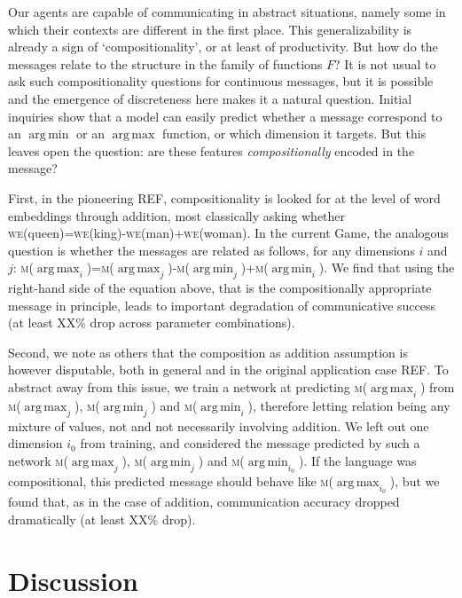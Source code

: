 \documentclass[11pt,a4paper]{article}
\DeclareMathOperator*{\argmax}{arg\,max}
\DeclareMathOperator*{\argmin}{arg\,min}
\newcommand{\nbEC}[1]{{\leavevmode\color{blue}{\scriptsize#1}}}
\newcommand{\addEC}[1]{{\leavevmode\color{blue}#1}}
\begin{document}
Our agents are capable of communicating in abstract situations, namely some in which their contexts are different in the first place. This generalizability is already a sign of `compositionality', or at least of productivity. But how do the messages relate to the structure in the family of functions $F$? It is not usual to ask such compositionality questions for continuous messages, but it is possible and the emergence of discreteness here makes it a natural question. Initial inquiries show that a model can easily predict whether a message correspond to an $\argmin$ or an $\argmax$ function, or which dimension it targets. But this leaves open the question: are these features \emph{compositionally} encoded in the message?

\newcommand{\WE}[1]{\textsc{we}(#1)}
\newcommand{\MESS}[1]{\textsc{m}(#1)}

First, in the pioneering \addEC{REF}, compositionality is looked for at the level of word embeddings through addition, most classically asking whether  
\WE{queen}=\WE{king}-\WE{man}+\WE{woman}. In the current Game, the analogous question is whether the messages are related as follows, for any dimensions $i$ and $j$:
\MESS{$\argmax_i$}=\MESS{$\argmax_j$}-\MESS{$\argmin_j$}+\MESS{$\argmin_i$}. We find that using the right-hand side of the equation above, that is the compositionally appropriate message in principle, leads to important degradation of communicative success \addEC{(at least XX\% drop across parameter combinations).}
\nbEC{Can describe results that efficiently?}

Second, we note as others that the composition as addition assumption is however disputable, both in general and in the original application case \addEC{REF}. To abstract away from this issue, we train a network at predicting 
\MESS{$\argmax_i$} from \MESS{$\argmax_j$}, \MESS{$\argmin_j$} and \MESS{$\argmin_i$}, therefore letting relation being any mixture of values, not and not necessarily involving addition. We left out one dimension $i_0$ from training, and considered the message predicted by such a network \MESS{$\argmax_j$}, \MESS{$\argmin_j$} and \MESS{$\argmin_{i_0}$}. If the language was compositional, this predicted message should behave like \MESS{$\argmax_{i_0}$}, but we found that, as in the case of addition, communication accuracy dropped dramatically \addEC{(at least XX\% drop).}
\nbEC{cite Baroni's (or others) similar tests?}


\section{Discussion}
\end{document}
